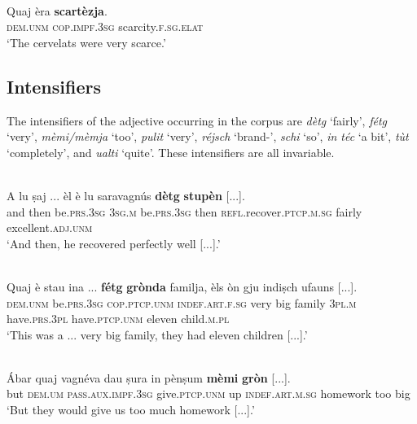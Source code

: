 \ea

\\
\gll Quaj èra \textbf{scartèzja}.   \\
\textsc{dem.unm} \textsc{cop.impf.3sg} scarcity.\textsc{f.sg.elat}\\
\glt `The cervelats were very scarce.'
\z

\subsection{Intensifiers}
The intensifiers of the adjective occurring in the corpus are \textit{dètg} `fairly', \textit{fétg} `very', \textit{mèmi/mèmja} `too', \textit{pulit} `very', \textit{réjsch} `brand-', \textit{schi} `so', \textit{in téc} `a bit', \textit{tùt} `completely', and \textit{ualti} `quite'. These intensifiers are all invariable.

\ea

\\
\gll A lu ṣaj ... èl è lu saravagnús \textbf{dètg} \textbf{stupèn} [...].   \\
and then be.\textsc{prs.3sg} {} \textsc{3sg.m} be.\textsc{prs.3sg} then \textsc{refl}.recover.\textsc{ptcp.m.sg} fairly  excellent.\textsc{adj.unm}\\
\glt `And then, he recovered perfectly well [...].'
\z

\ea

\\
\gll Quaj è stau ina ... \textbf{fétg} \textbf{grònda} familja, èls òn gju indiṣch ufauns [...].   \\
\textsc{dem.unm}  be.\textsc{prs.3sg}  \textsc{cop.ptcp.unm} \textsc{indef.art.f.sg} {} very big family \textsc{3pl.m} have.\textsc{prs.3pl} have.\textsc{ptcp.unm} eleven child.\textsc{m.pl}\\
\glt `This was a ... very big family, they had eleven children [...].'
\z

\ea

\\
\gll  Ábar quaj vagnéva dau ṣura in pènṣum \textbf{mèmi} \textbf{gròn} [...].  \\
but \textsc{dem.um} \textsc{pass.aux.impf.3sg} give.\textsc{ptcp.unm} up \textsc{indef.art.m.sg} homework too big\\
\glt `But they would give us too much homework [...].'
\z

